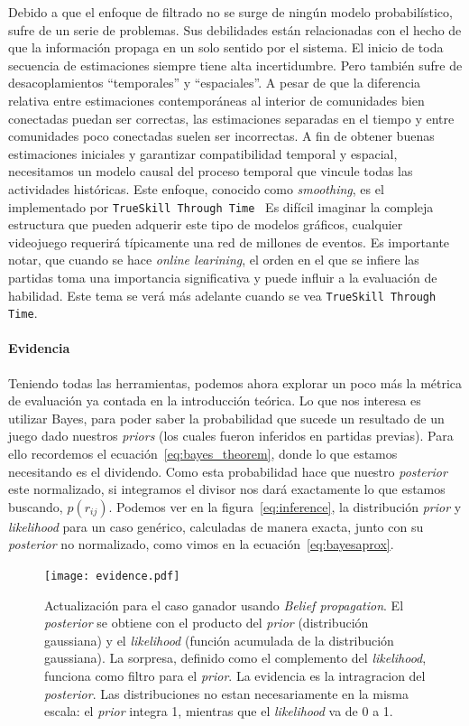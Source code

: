 \documentclass[11pt,twoside,spanish]{report} %
\begin{document}
 Debido a que el enfoque de filtrado no se surge de ningún modelo probabil\'istico, sufre de un serie de problemas.
 Sus debilidades están relacionadas con el hecho de que la informaci\'on propaga en un solo sentido por el sistema.
 El inicio de toda secuencia de estimaciones siempre tiene alta incertidumbre.
 Pero también sufre de desacoplamientos ``temporales'' y ``espaciales''.
 A pesar de que la diferencia relativa entre estimaciones contempor\'aneas al interior de comunidades bien conectadas puedan ser correctas, las estimaciones separadas en el tiempo y entre comunidades poco conectadas suelen ser incorrectas.
 A fin de obtener buenas estimaciones iniciales y garantizar compatibilidad temporal y espacial, necesitamos un modelo causal del proceso temporal que vincule todas las actividades hist\'oricas.
 Este enfoque, conocido como \emph{smoothing}, es el implementado por \texttt{TrueSkill Through Time}~\cite{Dangauthier2007}
 Es dif\'icil imaginar la compleja estructura que pueden adquerir este tipo de modelos gr\'aficos, cualquier videojuego requerirá t\'ipicamente una red de millones de eventos.
Es importante notar, que cuando se hace \textit{online learining}, el orden en el que se infiere las partidas toma una importancia significativa y  puede influir a la evaluaci\'on de habilidad.
Este tema se ver\'a m\'as adelante cuando se vea \texttt{TrueSkill Through Time}.


\paragraph{Evidencia}
Teniendo todas las herramientas, podemos ahora explorar un poco m\'as la m\'etrica de evaluaci\'on ya contada en la introducci\'on te\'orica.
Lo que nos interesa es utilizar Bayes, para poder saber la probabilidad que sucede un resultado de un juego dado nuestros \textit{priors} (los cuales fueron inferidos en partidas previas).
Para ello recordemos el ecuaci\'on~\ref{eq:bayes_theorem}, donde lo que estamos necesitando es el dividendo.
Como esta probabilidad hace que nuestro \textit{posterior} este normalizado, si integramos el divisor nos dar\'a exactamente lo que estamos buscando, $p(r_{ij})$.
Podemos ver en la figura~\ref{eq:inference}, la distribuci\'on \textit{prior} y \textit{likelihood} para un caso gen\'erico, calculadas de manera exacta, junto con su \textit{posterior} no normalizado, como vimos en la ecuaci\'on~\ref{eq:bayesaprox}.


\begin{figure}[H]
	\centering
	\texttt{[image: evidence.pdf]}
	\caption{Actualizaci\'on para el caso ganador usando \textit{Belief propagation}. El \textit{posterior} se obtiene con el producto del \textit{prior} (distribuci\'on gaussiana) y el \textit{likelihood} (funci\'on acumulada de la distribuci\'on gaussiana). La sorpresa, definido como el complemento del \textit{likelihood}, funciona como filtro para el \textit{prior}. La evidencia es la intragracion del \textit{posterior}. Las distribuciones no estan necesariamente en la misma escala: el \textit{prior} integra 1, mientras que el \textit{likelihood} va de 0 a 1.}
	\label{fig:evidencia}
\end{figure}
\end{document}
